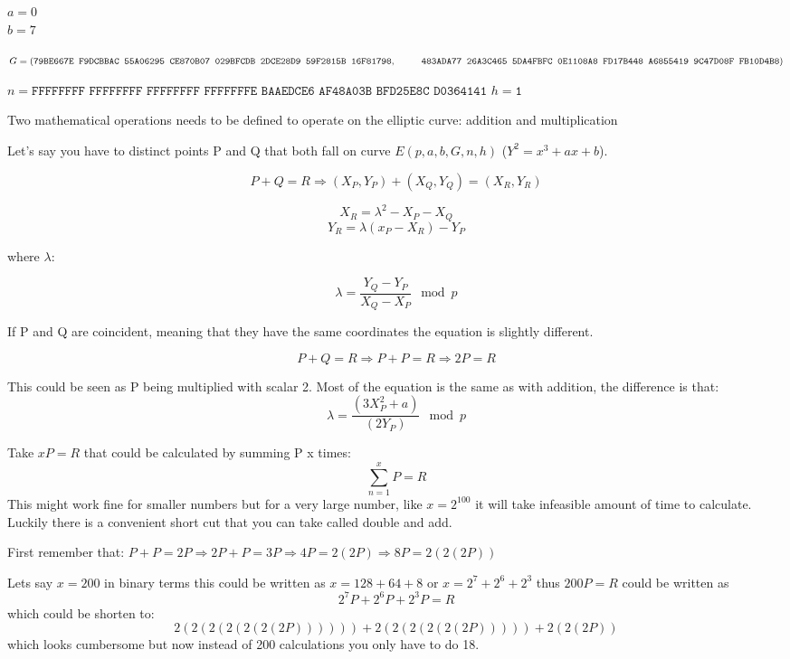 $a=0$\\
$b=7$

$G=(\texttt{79BE667E F9DCBBAC 55A06295 CE870B07 029BFCDB 2DCE28D9 59F2815B 16F81798},\\ \null\qquad\:\:\: 
\texttt{483ADA77 26A3C465 5DA4FBFC 0E1108A8 FD17B448 A6855419 9C47D08F FB10D4B8})$


$n=\texttt{FFFFFFFF FFFFFFFF FFFFFFFF FFFFFFFE BAAEDCE6 AF48A03B BFD25E8C D0364141}$
$h=\texttt{1}$

Two mathematical operations needs to be defined to operate on the elliptic curve: 
addition and multiplication

Let's say you have to distinct points P and Q that both fall on curve $E(p,a,b,G,n,h)$ 
($Y^2=x^3+ax+b$). 

$$P+Q=R \Rightarrow (X_P, Y_P) + (X_Q, Y_Q) = (X_R, Y_R)$$

$$X_R = \lambda^2-X_P-X_Q$$
$$Y_R = \lambda(x_P-X_R) -Y_P$$

where $\lambda$:

$$\lambda = \frac{Y_Q-Y_P}{X_Q - X_P} \mod p$$

If P and Q are coincident, meaning that they have the same coordinates the equation 
is slightly different. 

$$P+Q=R \Rightarrow P+P=R \Rightarrow 2P=R$$ 

This could be seen as P being multiplied with scalar 2. Most of the equation is the same 
as with addition, the difference is that:\\
$$\lambda = \frac{(3X^2_P + a)}{(2Y_P)} \mod p$$

Take $xP=R$ that could be calculated by summing P x times:
$$\sum_{n=1}^{x} P = R$$
This might work fine for smaller numbers but for a very large number, like $x=2^{100}$ it will 
take infeasible amount of time to calculate. Luckily there is a convenient short cut that you 
can take called double and add. 

First remember that: $P+P = 2P \Rightarrow 2P + P = 3P \Rightarrow 4P = 2(2P) \Rightarrow 8P = 2(2(2P))$

Lets say $x=200$ in binary terms this could be written as $x=128+64+8$ or $x=2^7+2^6+2^3$ 
thus $200P=R$ could be written as 
$$2^7P+2^6P+2^3P=R$$ 
which could be shorten to: 
$$2(2(2(2(2(2(2P)))))) + 2(2(2(2(2(2P))))) + 2(2(2P))$$ 
which looks cumbersome but now instead of 200 calculations you only have to do 18.


